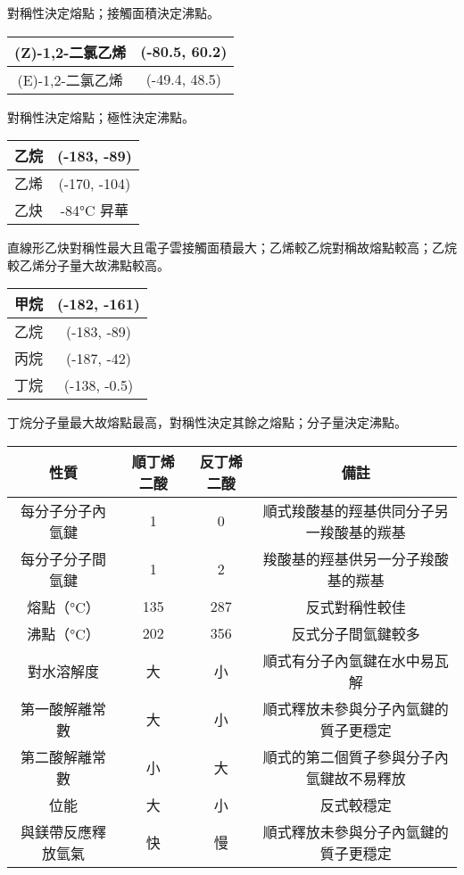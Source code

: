 \documentclass[a4paper,12pt]{report}
\begin{document}
對稱性決定熔點；接觸面積決定沸點。
\begin{longtable}[c]{|c|c|}
\hline
(Z)-1,2-二氯乙烯 & (-80.5, 60.2)\\\hline
(E)-1,2-二氯乙烯 & (-49.4, 48.5)\\\hline
\end{longtable}\FB
對稱性決定熔點；極性決定沸點。
\begin{longtable}[c]{|c|c|}
\hline
乙烷 & (-183, -89)\\\hline
乙烯 & (-170, -104)\\\hline
乙炔 & -84°C 昇華\\\hline
\end{longtable}\FB
直線形乙炔對稱性最大且電子雲接觸面積最大；乙烯較乙烷對稱故熔點較高；乙烷較乙烯分子量大故沸點較高。
\begin{longtable}[c]{|c|c|}
\hline
甲烷 & (-182, -161)\\\hline
乙烷 & (-183, -89)\\\hline
丙烷 & (-187, -42)\\\hline
丁烷 & (-138, -0.5)\\\hline
\end{longtable}\FB
丁烷分子量最大故熔點最高，對稱性決定其餘之熔點；分子量決定沸點。
\begin{longtable}[c]{|c|c|c|c|}
\hline
性質 & 順丁烯二酸 & 反丁烯二酸 & 備註 \\\hline\endhead
每分子分子內氫鍵 & 1 & 0 & 順式羧酸基的羥基供同分子另一羧酸基的羰基 \\\hline
每分子分子間氫鍵 & 1 & 2 & 羧酸基的羥基供另一分子羧酸基的羰基 \\\hline
熔點（°C） & 135 & 287 & 反式對稱性較佳 \\\hline
沸點（°C） & 202 & 356 & 反式分子間氫鍵較多 \\\hline
對水溶解度 & 大 & 小 & 順式有分子內氫鍵在水中易瓦解 \\\hline
第一酸解離常數 & 大 & 小 & 順式釋放未參與分子內氫鍵的質子更穩定 \\\hline
第二酸解離常數 & 小 & 大 & 順式的第二個質子參與分子內氫鍵故不易釋放 \\\hline
位能 & 大 & 小 & 反式較穩定 \\\hline
與鎂帶反應釋放氫氣 & 快 & 慢 & 順式釋放未參與分子內氫鍵的質子更穩定\\\hline
\end{longtable}\FB
\end{document}
